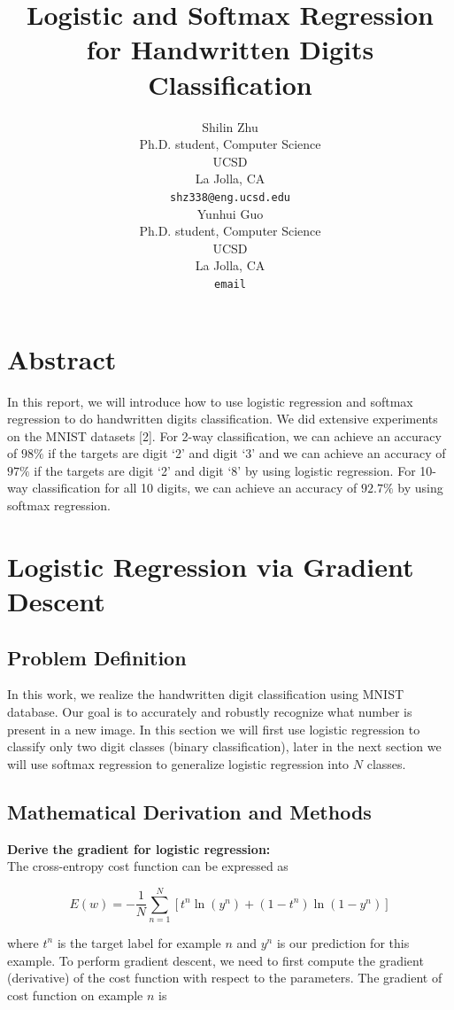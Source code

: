 \documentclass{article} %
\title{Logistic and Softmax Regression for Handwritten Digits Classification}
\author{
Shilin Zhu \\
Ph.D. student, Computer Science\\
UCSD\\
La Jolla, CA \\
\texttt{shz338@eng.ucsd.edu} \\
\And
Yunhui Guo\\
Ph.D. student, Computer Science\\
UCSD\\
La Jolla, CA \\
\texttt{email} \\
}
\begin{document}
\maketitle

\section{Abstract}
In this report, we will introduce how to use logistic regression and softmax regression to do handwritten digits classification. We did extensive experiments on the MNIST datasets [2]. For 2-way classification, we can achieve an accuracy of $98\%$ if the targets are digit `2' and digit `3' and we can achieve an accuracy of $97\%$ if the targets are digit `2' and digit `8' by using logistic regression. For 10-way classification for all 10 digits, we can achieve an accuracy  of $92.7\%$ by using softmax regression.

\section{Logistic Regression via Gradient Descent}

\subsection{Problem Definition}
In this work, we realize the handwritten digit classification using MNIST database. Our goal is to accurately and robustly recognize what number is present in a new image. In this section we will first use logistic regression to classify only two digit classes (binary classification), later in the next section we will use softmax regression to generalize logistic regression into $N$ classes.

\subsection{Mathematical Derivation and Methods}
\textbf{Derive the gradient for logistic regression:} \\
The cross-entropy cost function can be expressed as

\begin{equation}
	E(w) = - \frac{1}{N}\sum_{n=1}^{N}[t^{n}\ln(y^{n})+(1-t^{n})\ln(1-y^{n})]
\end{equation}

where $t^{n}$ is the target label for example $n$ and $y^{n}$ is our prediction for this example. To perform gradient descent, we need to first compute the gradient (derivative) of the cost function with respect to the parameters. The gradient of cost function on example $n$ is
\end{document}
